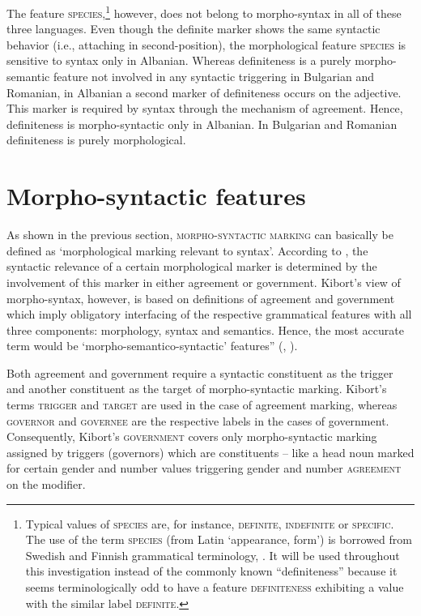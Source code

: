 The feature \textsc{species},\footnote{Typical values of \textsc{species} are, for instance, \textsc{definite, indefinite} or \textsc{specific}. The use of the term \textsc{species} (from Latin ‘appearance, form’) is borrowed from Swedish and Finnish grammatical terminology, \citep[cf., e.g.,][]{holm-etal1970,itkonen-t1980a}. It will be used throughout this investigation instead of the commonly known “definiteness” because it seems terminologically odd to have a feature \textsc{definiteness} exhibiting a value with the similar label \textsc{definite}.} however, does not belong to morpho-syntax in all of these three languages. Even though the definite marker shows the same syntactic behavior (i.e., attaching in second-position), the morphological feature \textsc{species} is sensitive to syntax only in Albanian. Whereas definiteness is a purely morpho-semantic feature not involved in any syntactic triggering in Bulgarian and Romanian, in Albanian a second marker of definiteness occurs on the adjective. This marker is required by syntax through the mechanism of agreement. Hence, definiteness is morpho-syntactic only in Albanian. In Bulgarian and Romanian definiteness is purely morphological.

\section{Morpho-syntactic features}
\label{crit eval}
As shown in the previous section, \textsc{morpho-syntactic marking} can basically be defined as ‘morphological marking relevant to syntax’. According to \citet{kibort2010a}, the syntactic relevance of a certain morphological marker is determined by the involvement of this marker in either agreement or government. Kibort's view of morpho-syntax, however, is based on definitions of agreement and government which imply obligatory interfacing of the respective grammatical features with all three components: morphology, syntax and semantics. Hence, the most accurate term would be ‘morpho-semantico-syntactic’ features” (\citealt{kibort2008a}, \citealt[cf.~also]{kibort2010a}).

Both agreement and government require a syntactic constituent as the trigger and another constituent as the target of morpho-syntactic marking. Kibort's terms \textsc{trigger} and \textsc{target} are used in the case of agreement marking, whereas \textsc{governor} and \textsc{governee} are the respective labels in the cases of government. Consequently, Kibort's \textsc{government} covers only morpho-syntactic marking assigned by triggers (governors) which are constituents – like a head noun marked for certain gender and number values triggering gender and number \textsc{agreement} on the modifier.

